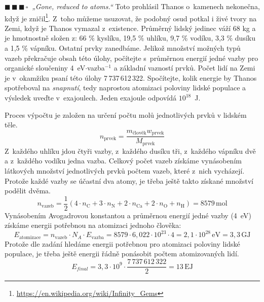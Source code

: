\documentclass{book}
\newcommand{\tri}{$\blacksquare \, \blacksquare \, \blacksquare \, \square \; \; $}
\renewenvironment{quotation}{\par}{\par} %
\begin{document}
\hrulefill %
\begin{quotation}
\tri \textit{„Gone, reduced to atoms.``} Toto prohlásil Thanos o~kamenech nekonečna,
když je zničil\footnote{\href{https://en.wikipedia.org/wiki/Infinity_Gems}{https://en.wikipedia.org/wiki/Infinity\_Gems}}. Z~toho můžeme usuzovat, že podobný osud potkal i
živé tvory na Zemi, když je Thanos vymazal z~existence. Průměrný
lidský jedinec váží 68 kg a je hmotnostně složen z: 66 \% kyslíku,
19,5 \% uhlíku, 9,7 \% vodíku, 3,3 \% dusíku a 1,5 \% vápníku. Ostatní
prvky zanedbáme. Jelikož množství možných typů vazeb překračuje obsah
této úlohy, počítejte s~průměrnou energií jedné vazby pro organické
sloučeniny 4~eV$\cdot$vazba$^{-1}$ a základní vazností prvků. Počet
lidí na Zemi je v~okamžiku psaní této úlohy 7\,737\,612\,322. Spočítejte,
kolik energie by Thanos spotřeboval na \textit{snapnutí}, tedy naprostou atomizaci
poloviny lidské populace a výsledek uveďte v~exajoulech. Jeden exajoule
odpovídá $10^{18}$~J.
\end{quotation} \dotfill \par 
Proces výpočtu je založen na určení počtu molů jednotlivých prvků
v lidském těle.
\[
n_{\mathrm{prvek}}=\frac{m_{\mathrm{člověk}}w_{\mathrm{prvek}}}{M_{\mathrm{prvek}}}
\]
Z~každého uhlíku jdou čtyři vazby, z~každého dusíku tři, z~každého vápníku dvě a z~každého vodíku jedna vazba. Celkový počet vazeb získáme vynásobením látkových množství jednotlivých prvků počtem vazeb, které z~nich vycházejí. Protože každé vazby se účastní dva atomy, je třeba ještě takto získané množství podělit dvěma.
\[
n_{\mathrm{vazeb}} = \frac12 ( 4\cdot n_{\mathrm{C}}+3\cdot n_{\mathrm{N}}+2\cdot n_{\mathrm{Ca}}+2\cdot n_{\mathrm{O}}+n_{\mathrm{H}})=8579\, \mathrm{mol}
\]
Vynásobením Avogadrovou konstantou a průměrnou energií jedné vazby (4~eV) získáme energii potřebnou na atomizaci jednoho člověka:
\[
E_{\mathrm{atomizace}}=n_{\mathrm{vazeb}}\cdot N_{A} \cdot E_{\mathrm{vazba}}=8579\cdot 6,022 \cdot 10^{23}\cdot 4=2,1\cdot 10^{28}\,\mathrm{eV} = 3,3 \, \mathrm{GJ}
\]
Protože dle zadání hledáme energii potřebnou pro atomizaci poloviny lidské populace, je třeba ještě energii řádně ponásobit počtem atomizovaných lidí.
\[
E_{final} = 3,3 \cdot 10^9 \cdot \frac{7\,737\,612\,322}{2} = 13 \, \mathrm{EJ}
\]
\end{document}
